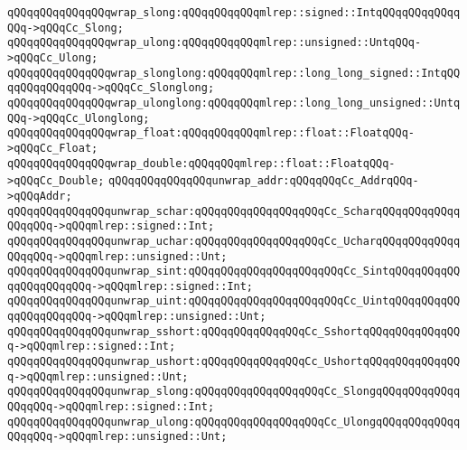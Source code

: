 \newline
\verb|qQQqqQQqqQQqqQQqwrap_slong:qQQqqQQqqQQqmlrep::signed::IntqQQqqQQqqQQqqQQq->qQQqCc_Slong;|\newline
\verb|qQQqqQQqqQQqqQQqwrap_ulong:qQQqqQQqqQQqmlrep::unsigned::UntqQQq->qQQqCc_Ulong;|\newline
\newline
\verb|qQQqqQQqqQQqqQQqwrap_slonglong:qQQqqQQqmlrep::long_long_signed::IntqQQqqQQqqQQqqQQq->qQQqCc_Slonglong;|\newline
\verb|qQQqqQQqqQQqqQQqwrap_ulonglong:qQQqqQQqmlrep::long_long_unsigned::UntqQQq->qQQqCc_Ulonglong;|\newline
\newline
\verb|qQQqqQQqqQQqqQQqwrap_float:qQQqqQQqqQQqmlrep::float::FloatqQQq->qQQqCc_Float;|\newline
\verb|qQQqqQQqqQQqqQQqwrap_double:qQQqqQQqmlrep::float::FloatqQQq->qQQqCc_Double;|\newline
\newline
\verb|qQQqqQQqqQQqqQQqunwrap_addr:qQQqqQQqCc_AddrqQQq->qQQqAddr;|\newline
\newline
\verb|qQQqqQQqqQQqqQQqunwrap_schar:qQQqqQQqqQQqqQQqqQQqCc_ScharqQQqqQQqqQQqqQQqqQQq->qQQqmlrep::signed::Int;|\newline
\verb|qQQqqQQqqQQqqQQqunwrap_uchar:qQQqqQQqqQQqqQQqqQQqCc_UcharqQQqqQQqqQQqqQQqqQQq->qQQqmlrep::unsigned::Unt;|\newline
\newline
\verb|qQQqqQQqqQQqqQQqunwrap_sint:qQQqqQQqqQQqqQQqqQQqqQQqCc_SintqQQqqQQqqQQqqQQqqQQqqQQq->qQQqmlrep::signed::Int;|\newline
\verb|qQQqqQQqqQQqqQQqunwrap_uint:qQQqqQQqqQQqqQQqqQQqqQQqCc_UintqQQqqQQqqQQqqQQqqQQqqQQq->qQQqmlrep::unsigned::Unt;|\newline
\newline
\verb|qQQqqQQqqQQqqQQqunwrap_sshort:qQQqqQQqqQQqqQQqCc_SshortqQQqqQQqqQQqqQQq->qQQqmlrep::signed::Int;|\newline
\verb|qQQqqQQqqQQqqQQqunwrap_ushort:qQQqqQQqqQQqqQQqCc_UshortqQQqqQQqqQQqqQQq->qQQqmlrep::unsigned::Unt;|\newline
\newline
\verb|qQQqqQQqqQQqqQQqunwrap_slong:qQQqqQQqqQQqqQQqqQQqCc_SlongqQQqqQQqqQQqqQQqqQQq->qQQqmlrep::signed::Int;|\newline
\verb|qQQqqQQqqQQqqQQqunwrap_ulong:qQQqqQQqqQQqqQQqqQQqCc_UlongqQQqqQQqqQQqqQQqqQQq->qQQqmlrep::unsigned::Unt;|\newline
